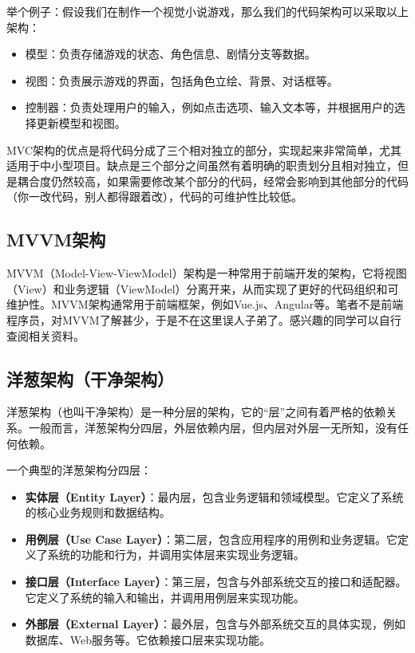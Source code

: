 \documentclass[../main.tex]{subfiles}
\begin{document}
举个例子：假设我们在制作一个视觉小说游戏，那么我们的代码架构可以采取以上架构：
\begin{itemize}
  \item 模型：负责存储游戏的状态、角色信息、剧情分支等数据。
  \item 视图：负责展示游戏的界面，包括角色立绘、背景、对话框等。
  \item 控制器：负责处理用户的输入，例如点击选项、输入文本等，并根据用户的选择更新模型和视图。
\end{itemize}

MVC架构的优点是将代码分成了三个相对独立的部分，实现起来非常简单，尤其适用于中小型项目。缺点是三个部分之间虽然有着明确的职责划分且相对独立，但是耦合度仍然较高，如果需要修改某个部分的代码，经常会影响到其他部分的代码（你一改代码，别人都得跟着改），代码的可维护性比较低。

\subsection{MVVM架构}
MVVM（Model-View-ViewModel）架构是一种常用于前端开发的架构，它将视图（View）和业务逻辑（ViewModel）分离开来，从而实现了更好的代码组织和可维护性。MVVM架构通常用于前端框架，例如Vue.js、Angular等。笔者不是前端程序员，对MVVM了解甚少，于是不在这里误人子弟了。感兴趣的同学可以自行查阅相关资料。

\subsection{洋葱架构（干净架构）}

洋葱架构（也叫干净架构）是一种分层的架构，它的“层”之间有着严格的依赖关系。一般而言，洋葱架构分四层，外层依赖内层，但内层对外层一无所知，没有任何依赖。

一个典型的洋葱架构分四层：
\begin{itemize}
  \item \textbf{实体层（Entity Layer）}：最内层，包含业务逻辑和领域模型。它定义了系统的核心业务规则和数据结构。
  \item \textbf{用例层（Use Case Layer）}：第二层，包含应用程序的用例和业务逻辑。它定义了系统的功能和行为，并调用实体层来实现业务逻辑。
  \item \textbf{接口层（Interface Layer）}：第三层，包含与外部系统交互的接口和适配器。它定义了系统的输入和输出，并调用用例层来实现功能。
  \item \textbf{外部层（External Layer）}：最外层，包含与外部系统交互的具体实现，例如数据库、Web服务等。它依赖接口层来实现功能。
\end{itemize}
\end{document}
